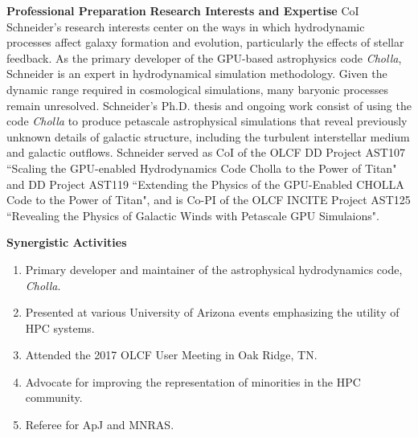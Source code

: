 \documentclass[11pt,letterpaper,english]{article}
\begin{document}
\begin{flushleft} {\bf Professional Preparation}
\vspace{-6pt}
{\bf Research Interests and Expertise}
{\parindent 16pt
CoI Schneider's research interests center on the ways in which hydrodynamic processes affect galaxy formation and evolution, particularly the effects of stellar feedback. As the primary developer of the GPU-based astrophysics code \textit{Cholla}, Schneider is an expert in hydrodynamical simulation methodology. Given the dynamic range required in cosmological simulations, many baryonic processes remain unresolved. Schneider's Ph.D. thesis and ongoing work consist of using the code \textit{Cholla} to produce petascale astrophysical simulations that reveal previously unknown details of galactic structure, including the turbulent interstellar medium and galactic outflows. Schneider served as CoI of the OLCF DD Project AST107 ``Scaling the GPU-enabled Hydrodynamics Code Cholla to the Power of Titan" and DD Project AST119 ``Extending the Physics of the GPU-Enabled CHOLLA Code to the Power of Titan", and is Co-PI of the OLCF INCITE Project AST125 ``Revealing the Physics of Galactic Winds with Petascale GPU Simulaions".
}

\vspace{.04in}
{\bf Synergistic Activities}
\vspace{-6pt}
\begin{enumerate} \itemsep1pt \parskip0pt 
\item Primary developer and maintainer of the astrophysical hydrodynamics code, \textit{Cholla}. \\ 
\item Presented at various University of Arizona events emphasizing the utility of HPC systems. \\ 
\item Attended the 2017 OLCF User Meeting in Oak Ridge, TN. \\ 
\item Advocate for improving the representation of minorities in the HPC community. \\
\item Referee for ApJ and MNRAS. \\
\end{enumerate} 


\end{flushleft}
\end{document}
